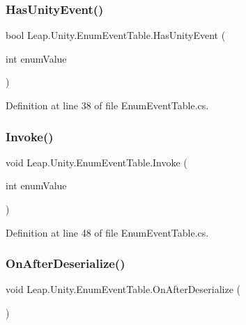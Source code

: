 \subsubsection{\texorpdfstring{HasUnityEvent()}{HasUnityEvent()}}
{\footnotesize\ttfamily bool Leap.\+Unity.\+Enum\+Event\+Table.\+Has\+Unity\+Event (\begin{DoxyParamCaption}\item[{int}]{enum\+Value }\end{DoxyParamCaption})}



Definition at line 38 of file Enum\+Event\+Table.\+cs.

\mbox{\label{class_leap_1_1_unity_1_1_enum_event_table_adbfb8b83e3f9f437151ecbced7afe35c}} 
\subsubsection{\texorpdfstring{Invoke()}{Invoke()}}
{\footnotesize\ttfamily void Leap.\+Unity.\+Enum\+Event\+Table.\+Invoke (\begin{DoxyParamCaption}\item[{int}]{enum\+Value }\end{DoxyParamCaption})}



Definition at line 48 of file Enum\+Event\+Table.\+cs.

\mbox{\label{class_leap_1_1_unity_1_1_enum_event_table_abb4ddfe2dedb2563e2d1f775de1beb05}} 
\subsubsection{\texorpdfstring{OnAfterDeserialize()}{OnAfterDeserialize()}}
{\footnotesize\ttfamily void Leap.\+Unity.\+Enum\+Event\+Table.\+On\+After\+Deserialize (\begin{DoxyParamCaption}{ }\end{DoxyParamCaption})}



